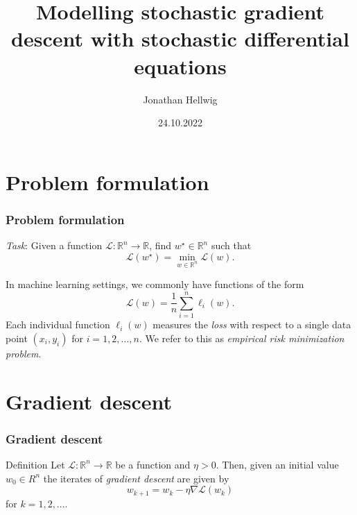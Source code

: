 \documentclass[17pt,institute=e10]{tuhh_presentation}
\title{Modelling stochastic gradient
descent with stochastic differential equations}
\date{24.10.2022}
\author[Jonathan Hellwig]{Jonathan Hellwig}
\newcommand{\R}{\mathbb{R}}
\newcommand{\Lo}{\mathcal{L} : \R^n \rightarrow \R}
\newcommand{\CL}{\mathcal{L}}
\begin{document}
\titlepage


\begin{frame}[agenda]
  \tableofcontents
\end{frame}

\section{Problem formulation}

\begin{frame}
  \frametitle{Problem formulation}
  \emph{Task}: Given a function $\CL : \R^n \rightarrow \R$, find $w^\star \in \R^n$ such that
  \begin{equation*}
    \CL(w^\star) = \min_{w \in \R^n} \CL(w).
  \end{equation*}

  In machine learning settings, we commonly have functions of the form
  \begin{equation*}
    \CL(w) = \frac{1}{n} \sum_{i=1}^n \ell_i(w).
  \end{equation*}
  Each individual function $\ell_i(w)$ measures the \textcolor{purple-pontifex}{\emph{loss}} with respect to a single data point $(x_i, y_i)$ for $i = 1,2, \dots, n$.
  We refer to this as \textcolor{purple-pontifex}{\emph{empirical risk minimization problem}}.
\end{frame}

\section{Gradient descent}

\begin{frame}[fragile]
  \frametitle{Gradient descent}

  \begin{block}{Definition}
    Let $\Lo$ be a function and $\eta > 0$. Then, given an initial value $w_0 \in R^n$ the iterates of \textcolor{purple-pontifex}{\emph{gradient descent}} are given by
  \begin{equation*}
    w_{k+1} = w_k - \eta \nabla \CL(w_k)
  \end{equation*}
  for $k = 1,2,\dots$.
  \end{block}

\end{frame}
\end{document}
